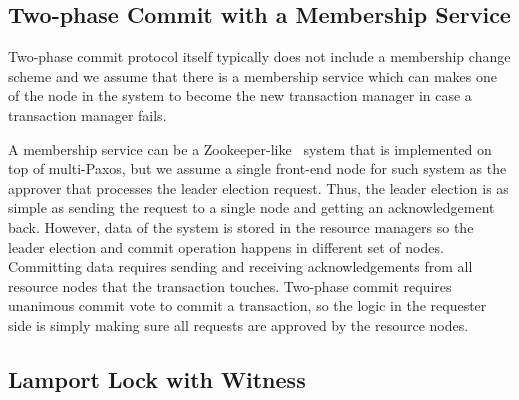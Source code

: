 \subsection{Two-phase Commit with a Membership Service}
\label{chapter:witnesspassing:subsec:two-phase-commit-with-a-membership-service}

Two-phase commit protocol itself typically does not include a membership
change scheme and we assume that there is a membership service which can makes one of the
node in the system to become the new transaction manager in case a transaction 
manager fails. 

A membership service can be a Zookeeper-like~\cite{zookeeper} system that is implemented on top
of multi-Paxos, but we assume a single front-end node for such system as the
approver that processes the leader election request. Thus, the leader election is 
as simple as sending the request to a single node and getting an acknowledgement back. 
However, data of the system is stored in the resource managers so the leader election and
commit operation happens in different set of nodes. Committing data requires sending
and receiving acknowledgements from all resource nodes that the transaction
touches.  Two-phase commit requires unanimous commit vote to commit a transaction, so the
logic in the requester side is simply making sure all requests are approved by
the resource nodes. 

\subsection{Lamport Lock with Witness}
\label{chapter:witnesspassing:subsec:lamport-lock-with-witness}


